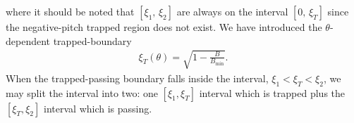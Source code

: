 \documentclass[11pt,a4paper]{article}
\newcommand{\sub}[1]{\ensuremath{_{\text{#1}}}}
\begin{document}
where it should be noted that $[\xi_1,\,\xi_2]$ are always on the interval $[0,\,\xi_T]$ since the negative-pitch trapped region does not exist.
We have introduced the $\theta$-dependent trapped-boundary
\begin{align}
\xi_T(\theta) = \sqrt{1-\frac{B}{B\sub{min}}}.
\end{align}
When the trapped-passing boundary falls inside the interval, $\xi_1 < \xi_T < \xi_2$, we may split the interval into two: one $[\xi_1,\xi_T]$ interval which is trapped plus the $[\xi_T,\xi_2]$ interval which is passing.  
\end{document}
